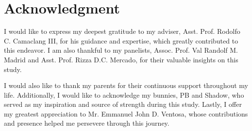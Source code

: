 \documentclass[journal]{./IEEE/IEEEtran}
\begin{document}


\section*{Acknowledgment}
I would like to express my deepest gratitude to my adviser, Asst. Prof. Rodolfo C. Camaclang III, for his guidance and expertise, which greatly contributed to this endeavor. I am also thankful to my panelists, Assoc. Prof. Val Randolf M. Madrid and Asst. Prof. Rizza D.C. Mercado, for their valuable insights on this study.

I would also like to thank my parents for their continuous support throughout my life. Additionally, I would like to acknowledge my bunnies, PB and Shadow, who served as my inspiration and source of strength during this study. Lastly, I offer my greatest appreciation to Mr. Emmanuel John D. Ventosa, whose contributions and presence helped me persevere through this journey.








\end{document}
